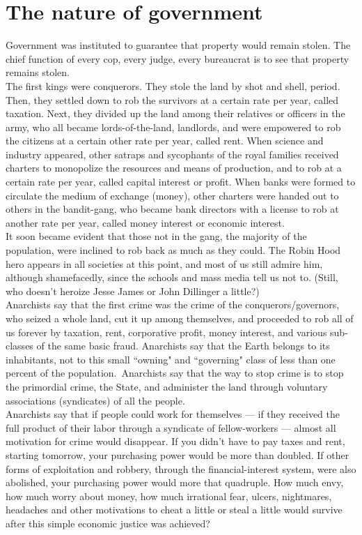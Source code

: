 \section*{The nature of government}

Government was instituted to guarantee that property would remain stolen. The chief function of every cop, every judge, every bureaucrat is to see that property remains stolen.\\
The first kings were conquerors. They stole the land by shot and shell, period. Then, they settled down to rob the survivors at a certain rate per year, called taxation. Next, they divided up the land among their relatives or officers in the army, who all became lords-of-the-land, landlords, and were empowered to rob the citizens at a certain other rate per year, called rent. When science and industry appeared, other satraps and sycophants of the royal families received charters to monopolize the resources and means of production, and to rob at a certain rate per year, called capital interest or profit. When banks were formed to circulate the medium of exchange (money), other charters were handed out to others in the bandit-gang, who became bank directors with a license to rob at another rate per year, called money interest or economic interest.\\
It soon became evident that those not in the gang, the majority of the population, were inclined to rob back as much as they could. The Robin Hood hero appears in all societies at this point, and most of us still admire him, although shamefacedly, since the schools and mass media tell us not to. (Still, who doesn't heroize Jesse James or John Dillinger a little?)\\
Anarchists say that the first crime was the crime of the conquerors/governors, who seized a whole land, cut it up among themselves, and proceeded to rob all of us forever by taxation, rent, corporative profit, money interest, and various sub-classes of the same basic fraud. Anarchists say that the Earth belongs to its inhabitants, not to this small ``owning" and ``governing" class of less than one percent of the population.\
Anarchists say that the way to stop crime is to stop the primordial crime, the State, and administer the land through voluntary associations (syndicates) of all the people.\\
Anarchists say that if people could work for themselves --- if they received the full product of their labor through a syndicate of fellow-workers --- almost all motivation for crime would disappear. If you didn't have to pay taxes and rent, starting tomorrow, your purchasing power would be more than doubled. If other forms of exploitation and robbery, through the financial-interest system, were also abolished, your purchasing power would more that quadruple. How much envy, how much worry about money, how much irrational fear, ulcers, nightmares, headaches and other motivations to cheat a little or steal a little would survive after this simple economic justice was achieved?

